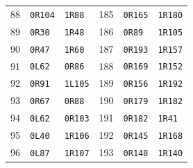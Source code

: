 \begin{longtable}{rllrll}
88 & \texttt{0R104} & \texttt{1R88} & 185 & \texttt{0R165} & \texttt{1R180} \\
89 & \texttt{0R30} & \texttt{1R48} & 186 & \texttt{0R89} & \texttt{1R105} \\
90 & \texttt{0R47} & \texttt{1R60} & 187 & \texttt{0R193} & \texttt{1R157} \\
91 & \texttt{0L62} & \texttt{0R86} & 188 & \texttt{0R169} & \texttt{1R152} \\
92 & \texttt{0R91} & \texttt{1L105} & 189 & \texttt{0R156} & \texttt{1R192} \\
93 & \texttt{0R67} & \texttt{0R88} & 190 & \texttt{0R179} & \texttt{1R182} \\
94 & \texttt{0L62} & \texttt{0R103} & 191 & \texttt{0R182} & \texttt{1R41} \\
95 & \texttt{0L40} & \texttt{1R106} & 192 & \texttt{0R145} & \texttt{1R168} \\
96 & \texttt{0L87} & \texttt{1R107} & 193 & \texttt{0R148} & \texttt{1R140} \\
\end{longtable}
\endgroup
